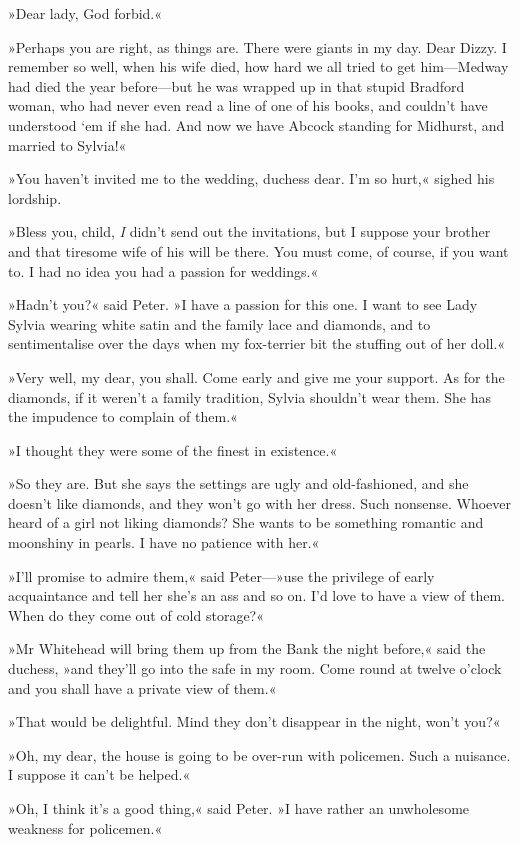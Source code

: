 »Dear lady, God forbid.«

»Perhaps you are right, as things are. There were giants in my day. Dear Dizzy. I remember so well, when his wife died, how hard we all tried to get him—Medway had died the year before—but he was wrapped up in that stupid Bradford woman, who had never even read a line of one of his books, and couldn't have understood `em if she had. And now we have Abcock standing for Midhurst, and married to Sylvia!«

»You haven't invited me to the wedding, duchess dear. I'm so hurt,« sighed his lordship.

»Bless you, child, \textit{I} didn't send out the invitations, but I suppose your brother and that tiresome wife of his will be there. You must come, of course, if you want to. I had no idea you had a passion for weddings.«

»Hadn't you?« said Peter. »I have a passion for this one. I want to see Lady Sylvia wearing white satin and the family lace and diamonds, and to sentimentalise over the days when my fox-terrier bit the stuffing out of her doll.«

»Very well, my dear, you shall. Come early and give me your support. As for the diamonds, if it weren't a family tradition, Sylvia shouldn't wear them. She has the impudence to complain of them.«

»I thought they were some of the finest in existence.«

»So they are. But she says the settings are ugly and old-fashioned, and she doesn't like diamonds, and they won't go with her dress. Such nonsense. Whoever heard of a girl not liking diamonds? She wants to be something romantic and moonshiny in pearls. I have no patience with her.«

»I'll promise to admire them,« said Peter—»use the privilege of early acquaintance and tell her she's an ass and so on. I'd love to have a view of them. When do they come out of cold storage?«

»Mr Whitehead will bring them up from the Bank the night before,« said the duchess, »and they'll go into the safe in my room. Come round at twelve o'clock and you shall have a private view of them.«

»That would be delightful. Mind they don't disappear in the night, won't you?«

»Oh, my dear, the house is going to be over-run with policemen. Such a nuisance. I suppose it can't be helped.«

»Oh, I think it's a good thing,« said Peter. »I have rather an unwholesome weakness for policemen.«


